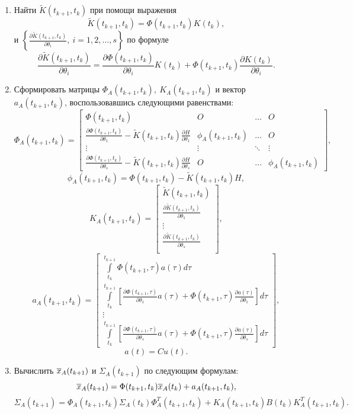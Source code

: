 \documentclass[a4paper,14pt]{extarticle}
\newcommand{\pd}[2]{\frac{\partial #1}{\partial #2}}
\begin{document}
\begin{enumerate}
	\item Найти $\tilde{K}(t_{k+1}, t_k)$ при помощи выражения 
	\[
		\tilde{K}(t_{k+1}, t_k) = \Phi(t_{k+1}, t_k) K(t_k),
	\]
	и $\left\{ \pd{\tilde{K}(t_{k+1}, t_k)}{\theta_i},\ i=1,2,\ldots,s \right\}$
	по формуле
		\[
			\pd{\tilde{K}(t_{k+1}, t_k)}{\theta_i} = 
				\pd{\Phi(t_{k+1}, t_k)}{\theta_i} K(t_k) + \Phi(t_{k+1}, t_k)
				\pd{K(t_k)}{\theta_i}.
		\]
	\item Сформировать матрицы $\Phi_A(t_{k+1}, t_k),\ K_A(t_{k+1}, t_k)$ и
		вектор $a_A(t_{k+1}, t_k)$, воспользовавшись следующими равенствами:
		\[
			\Phi_A(t_{k+1}, t_k) =
			\begin{bmatrix}
				\Phi(t_{k+1}, t_k) & O & \ldots & O \\
				\pd{\Phi(t_{k+1}, t_k)}{\theta_1} - \tilde{K}(t_{k+1}, t_k)
					\pd{H}{\theta_1} & \phi_A(t_{k+1}, t_k) & \ldots & O \\
				\vdots & \vdots & \ddots & \vdots \\
				\pd{\Phi(t_{k+1}, t_k)}{\theta_s} - \tilde{K}(t_{k+1}, t_k)
					\pd{H}{\theta_s} & O & \ldots & \phi_A(t_{k+1}, t_k)
			\end{bmatrix},
		\]
		\[
			\phi_A(t_{k+1}, t_k) = \Phi(t_{k+1}, t_k) - \tilde{K}(t_{k+1}, t_k) H,
		\]
		\[
			K_A(t_{k+1}, t_k) =
			\begin{bmatrix}
				\tilde{K}(t_{k+1}, t_k) \\
				\pd{\tilde{K}(t_{k+1}, t_k)}{\theta_1} \\
				\vdots \\
				\pd{\tilde{K}(t_{k+1}, t_k)}{\theta_s} \\
			\end{bmatrix},
		\]
		\[
			a_A(t_{k+1}, t_k) =
			\begin{bmatrix}
				\int\limits_{t_k}^{t_{k+1}} \Phi(t_{k+1}, \tau) a(\tau) d\tau \\
				\int\limits_{t_k}^{t_{k+1}} \left[ \pd{\Phi(t_{k+1}, \tau)}{\theta_1} 
					a(\tau) + \Phi(t_{k+1}, \tau) \pd{a(\tau)}{\theta_1} \right] d\tau \\
				\vdots \\
				\int\limits_{t_k}^{t_{k+1}} \left[ \pd{\Phi(t_{k+1}, \tau)}{\theta_s} 
					a(\tau) + \Phi(t_{k+1}, \tau) \pd{a(\tau)}{\theta_s} \right] d\tau 
			\end{bmatrix},
		\]
		\[
			a(t) = C u(t).
		\]

	\item Вычислить $\overline{x}_A(t_{k+1})$ и $\Sigma_A(t_{k+1})$ по следующим
		формулам:
		\[
			\overline{x}_A(t_{k+1}) = \Phi(t_{k+1}, t_k) \overline{x}_A(t_k) + a_A(t_{k+1}, t_k),
		\]
		\[
			\Sigma_A(t_{k+1}) = \Phi_A(t_{k+1}, t_k) \Sigma_A(t_k) \Phi_A^T(t_{k+1},
			t_k) + K_A(t_{k+1}, t_k) B(t_k) K_A^T(t_{k+1}, t_k).
		\]


\end{enumerate}
\end{document}
